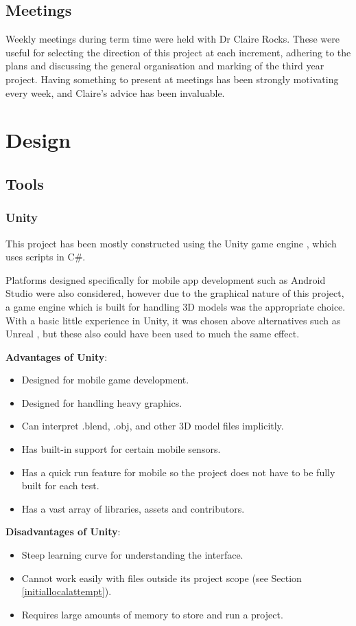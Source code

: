 \documentclass{article}
\begin{document}
\subsection{Meetings}
Weekly meetings during term time were held with Dr Claire Rocks. These were useful for selecting the direction of this project at each increment, adhering to the plans and discussing the general organisation and marking of the third year project. Having something to present at meetings has been strongly motivating every week, and Claire's advice has been invaluable.

\section{Design}
\subsection{Tools}
\subsubsection{Unity}
This project has been mostly constructed using the Unity game engine \cite{design:unity}, which uses scripts in C\#. 

Platforms designed specifically for mobile app development such as Android Studio \cite{design:android} were also considered, however due to the graphical nature of this project, a game engine which is built for handling 3D models was the appropriate choice. With a basic little experience in Unity, it was chosen above alternatives such as Unreal \cite{design:unreal}, but these also could have been used to much the same effect.

\textbf{Advantages of Unity}:
\begin{itemize}
    \item Designed for mobile game development.
    \item Designed for handling heavy graphics.
    \item Can interpret .blend, .obj, and other 3D model files implicitly.
    \item Has built-in support for certain mobile sensors.
    \item Has a quick run feature for mobile so the project does not have to be fully built for each test. 
    \item Has a vast array of libraries, assets and contributors.
\end{itemize}

\textbf{Disadvantages of Unity}:
\begin{itemize}
    \item Steep learning curve for understanding the interface.
    \item Cannot work easily with files outside its project scope (see Section \ref{initiallocalattempt}).
    \item Requires large amounts of memory to store and run a project.
\end{itemize}
\end{document}
